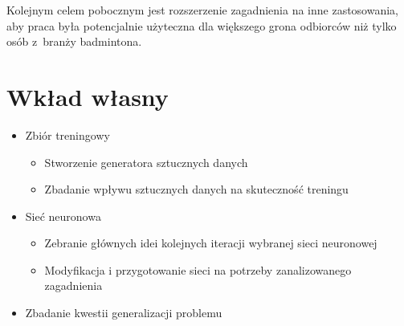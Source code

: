 Kolejnym celem pobocznym jest rozszerzenie zagadnienia na inne zastosowania, aby praca była potencjalnie użyteczna dla większego grona odbiorców niż tylko osób z~branży badmintona.
\\

\section{Wkład własny}

\begin{itemize}
	\item Zbiór treningowy
		\begin{itemize}
			\item Stworzenie generatora sztucznych danych 
			\item Zbadanie wpływu sztucznych danych na skuteczność treningu 
		\end{itemize}
	\item Sieć neuronowa
	\begin{itemize}
		\item Zebranie głównych idei kolejnych iteracji wybranej sieci neuronowej 
		\item Modyfikacja i przygotowanie sieci na potrzeby zanalizowanego zagadnienia 
	\end{itemize}
	\item Zbadanie kwestii generalizacji problemu 
\end{itemize}
